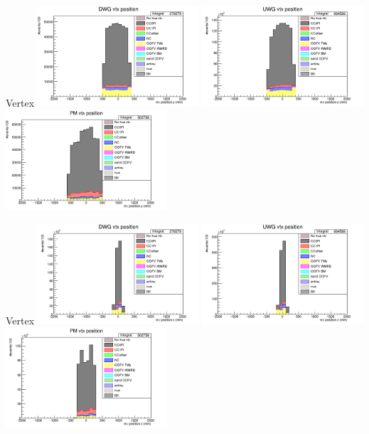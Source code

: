 \documentclass[%
 reprint,
 amsmath,amssymb,
 aps,
]{revtex4-2}
\begin{document}
\begin{frame}{Vertex}
    \includegraphics[width=0.45\textwidth]{images/vtx_reco_pos[1]_wgbm_topo_DWG_accum_level[][26]_data_mc.png}
    \includegraphics[width=0.45\textwidth]{images/vtx_reco_pos[1]_wgbm_topo_UWG_accum_level[][16]_data_mc.png}
    \includegraphics[width=0.45\textwidth]{images/vtx_reco_pos[1]_wgbm_topo_PM_accum_level[][06]_data_mc.png}
    \end{frame}

\begin{frame}{Vertex}
    \includegraphics[width=0.45\textwidth]{images/vtx_reco_pos[2]_wgbm_topo_DWG_accum_level[][26]_data_mc.png}
    \includegraphics[width=0.45\textwidth]{images/vtx_reco_pos[2]_wgbm_topo_UWG_accum_level[][16]_data_mc.png}
    \includegraphics[width=0.45\textwidth]{images/vtx_reco_pos[2]_wgbm_topo_PM_accum_level[][06]_data_mc.png}
\end{frame}
\end{document}
